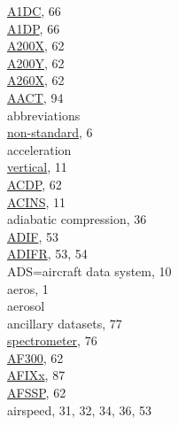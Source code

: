 \documentclass[
]{book}
\begin{document}
\href{./5-cloud-physics-variables.html\#a1dc-a1dp}{A1DC}, 66\\
\href{./5-cloud-physics-variables.html\#a1dc-a1dp}{A1DP}, 66\\
\href{./5-cloud-physics-variables.html\#CRPC}{A200X}, 62\\
\href{./5-cloud-physics-variables.html\#CRPC}{A200Y}, 62\\
\href{./5-cloud-physics-variables.html\#CRPC}{A260X}, 62\\
\href{./10-obsolete-variables.html\#AACT}{AACT}, 94\\
abbreviations\\
\hspace*{0.333em}\hspace*{0.333em}\href{./2-general-information-about-data-files.html\#units-and-abbreviations}{non-standard}, 6\\
acceleration\\
\hspace*{0.333em}\hspace*{0.333em}\href{./3-the-state-of-the-aircraft.html\#ACINS}{vertical}, 11\\
\href{./5-cloud-physics-variables.html\#CRPC}{ACDP}, 62\\
\href{./3-the-state-of-the-aircraft.html\#ACINS}{ACINS}, 11\\
adiabatic compression, 36\\
\href{./4-the-state-of-the-atmosphere.html\#adifr}{ADIF}, 53\\
\href{./4-the-state-of-the-atmosphere.html\#adifr}{ADIFR}, 53, 54\\
ADS=aircraft data system, 10\\
aeros, 1\\
aerosol\\
\hspace*{0.333em}\hspace*{0.333em}ancillary datasets, 77\\
\hspace*{0.333em}\hspace*{0.333em}\href{./7-aerosol-particle-measurements.html\#aerosol-spec}{spectrometer}, 76\\
\href{./5-cloud-physics-variables.html\#CRPC}{AF300}, 62\\
\href{./10-obsolete-variables.html\#vanes}{AFIXx}, 87\\
\href{./5-cloud-physics-variables.html\#CRPC}{AFSSP}, 62\\
airspeed, 31, 32, 34, 36, 53\\
\end{document}
